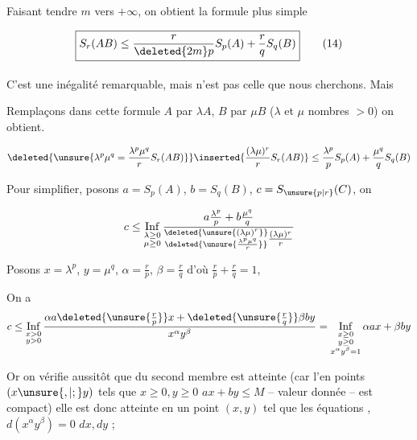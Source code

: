 Faisant tendre $m$ vers $+\infty$, on obtient la formule plus simple

\[
\boxed{S_r(AB)\leq\frac{r}{\deleted{2m}p}S_p(A)+\frac rq S_q(B)}\tag*{(14)}
\]

C'est une inégalité remarquable, mais n'est pas celle que nous cherchons. Mais \textsuperscript{}


Remplaçons dans cette formule $A$ par $\lambda A$, $B$ par $\mu B$ ($\lambda$ et $\mu$ nombres $>0$) on obtient.

\[
\deleted{\unsure{\lambda^p\mu^q=\frac{\lambda^p\mu^q}{r}S_r(AB)}}
\inserted{\frac{(\lambda\mu)^r}{r}S_r(AB)}
\leq\frac{\lambda^p}{p}S_p(A)+\frac{\mu^q}{q}S_q(B)
\]



Pour simplifier, posons $a=S_p(A)$, $b=S_q(B)$, $c=S_{\unsure{p|r}}(C)$, on 

\[
c\leq\mathop{\mathrm{Inf}}\limits_{\substack{\lambda\geq0\\\mu\geq0}}
\frac{a\frac{\lambda^p}{p}+b\frac{\mu^q}{q}}
{\substack{\deleted{\unsure{(\lambda\mu)^r}}\\\deleted{\unsure{\frac{\lambda^p\mu^q}{r}}}}\frac{(\lambda\mu)^r}{r}}
\]


Posons $x=\lambda^p$, $y=\mu^q$, $\alpha=\frac rp$, $\beta=\frac rq$  d'où \unsure{,} \uline{$\frac rp+\frac rq=1$},

On a
\[
c\leq\mathop{\mathrm{Inf}}\limits_{\substack{x>0\\y>0}}
\frac{\alpha a\deleted{\unsure{\frac rp}}x+\deleted{\unsure{\frac rq}}\beta by}{x^\alpha y^\beta}
=\mathop{\mathrm{Inf}}\limits_{\substack{x\geq0\\y\geq0\\x^\alpha y^\beta=1}}\alpha a x+\beta by
\]

Or on vérifie aussitôt que   du second membre est atteinte (car l'en  points $(x\unsure{,|;}y)$ tels que $x\geq0,y\geq0$ $ax+by\leq M$ -- valeur donnée -- est compact) elle est donc atteinte en un point $(x,y)$ tel que les équations , $d(x^\alpha y^\beta)=0$   $dx,dy$ ;

